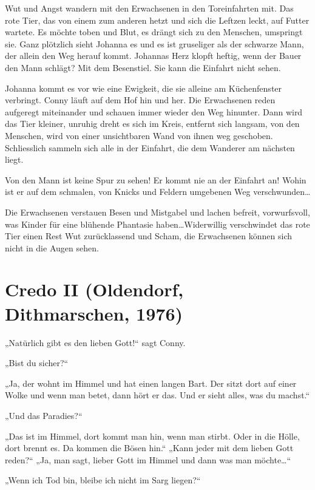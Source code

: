 Wut und Angst wandern mit den Erwachsenen in den Toreinfahrten mit. Das rote Tier, das von einem zum anderen hetzt und sich die Leftzen leckt, auf Futter wartete. Es möchte toben und Blut, es drängt sich zu den Menschen, umspringt sie. Ganz plötzlich sieht Johanna es und es ist gruseliger als der schwarze Mann, der allein den Weg herauf kommt. Johannas Herz klopft heftig, wenn der Bauer den Mann schlägt? Mit dem Besenstiel. Sie kann die Einfahrt nicht sehen. 

Johanna kommt es vor wie eine Ewigkeit, die sie alleine am Küchenfenster verbringt. Conny läuft auf dem Hof hin und her. Die Erwachsenen reden aufgeregt miteinander und schauen immer wieder den Weg hinunter. Dann wird das  Tier kleiner, unruhig dreht es sich im Kreis, entfernt sich langsam, von den Menschen, wird von einer unsichtbaren Wand von ihnen weg geschoben.
Schliesslich sammeln sich alle in der Einfahrt, die dem Wanderer am nächsten liegt.  

Von den Mann ist keine Spur zu sehen! Er kommt nie an der Einfahrt an!
Wohin ist er auf dem schmalen, von Knicks und Feldern umgebenen Weg verschwunden\dots

Die Erwachsenen verstauen Besen und Mistgabel und lachen befreit, vorwurfsvoll, was Kinder für eine blühende Phantasie haben\dots Widerwillig verschwindet das rote Tier einen Rest Wut zurücklassend und Scham, die Erwachsenen können sich nicht in die Augen sehen.



\section*{Credo II (Oldendorf, Dithmarschen, 1976)}



„Natürlich gibt es den lieben Gott!“ sagt Conny. 

„Bist du sicher?“

„Ja, der wohnt im Himmel und hat einen langen Bart. Der sitzt dort auf einer Wolke und wenn man betet, dann hört er das. Und er sieht alles, was du machst.“

„Und das Paradies?“  

„Das ist im Himmel, dort kommt man hin, wenn man stirbt. Oder in die Hölle, dort brennt es. Da kommen die Bösen hin.“ 
„Kann jeder mit dem lieben Gott reden?“ „Ja, man sagt, lieber Gott im Himmel und dann was man möchte\dots“


„Wenn ich Tod bin, bleibe ich nicht im Sarg liegen?“


